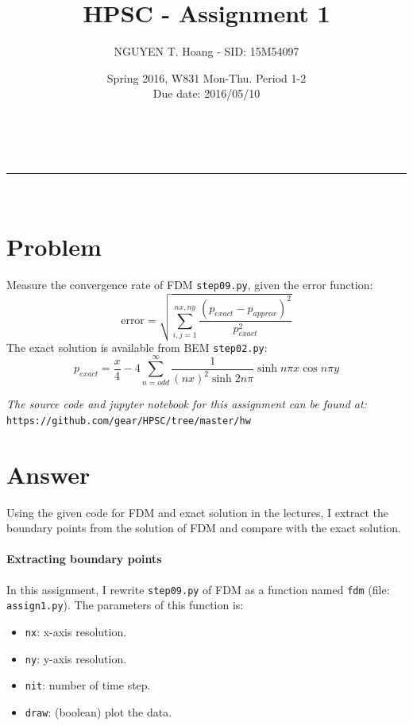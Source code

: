 \documentclass[a4paper,12pt]{article}
\makeatletter
\newcommand{\linia}{\rule{\linewidth}{0.5pt}}
\renewcommand{\maketitle} {%
\begin{center}
\vspace{2ex}
{\huge \textsc{\@title}}
\vspace{1ex}
\\
\linia\\
\@author \hfill \@date
\vspace{4ex}
\end{center}
}
\makeatother
\begin{document}

\title{HPSC - Assignment 1}

\author{NGUYEN T. Hoang - SID: 15M54097}

\date{Spring 2016, W831 Mon-Thu. Period 1-2 \\ \hfill Due date: 2016/05/10}

\maketitle

\vspace{8em}
\section*{Problem}
\noindent
Measure the convergence rate of FDM \texttt{step09.py}, given the error function:
$$ \mbox{error} = \sqrt{\sum_{i,j=1}^{nx,ny}\frac{(p_{exact} - p_{approx})^2}{p_{exact}^2}} $$
The exact solution is available from BEM \texttt{step02.py}:
$$ p_{exact} = \frac{x}{4} - 4 \sum_{n=odd}^{\infty} \frac{1}{(nx)^2\sinh{2n\pi}}\sinh{n\pi x}\cos{n\pi y} $$

\vspace{10em}
\noindent
\emph{The source code and jupyter notebook for this assignment can be found at:} \\
\texttt{https://github.com/gear/HPSC/tree/master/hw}
\pagebreak
\section*{Answer}

\noindent
Using the given code for FDM and exact solution in the lectures, I extract the boundary points from the solution of FDM and compare with the exact solution.

\paragraph{Extracting boundary points} In this assignment, I rewrite \texttt{step09.py} of FDM as a function named \texttt{fdm} (file: \texttt{assign1.py}). The parameters of this function is:
\begin{itemize}
  \setlength{\parskip}{0em}
  \item \texttt{nx}: x-axis resolution.
  \item \texttt{ny}: y-axis resolution.
  \item \texttt{nit}: number of time step.
  \item \texttt{draw}: (boolean) plot the data.
\end{itemize}
\end{document}
